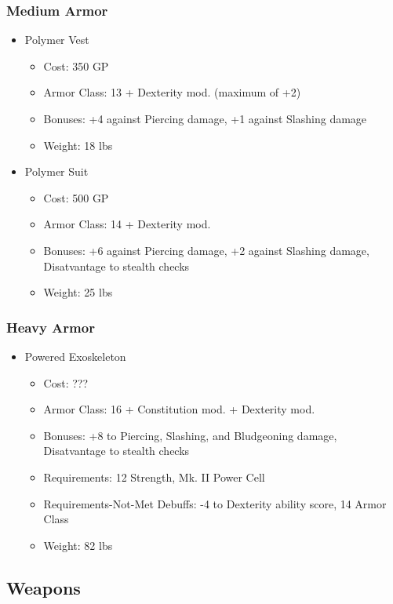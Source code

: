 \documentclass[12pt, landscape]{article}
\begin{document}
\begin{FlushLeft}
\begin{multicols}{2}
			\subsubsection{Medium Armor}
			\begin{itemize}
				\item Polymer Vest
				\begin{itemize}
					\item Cost: 350 GP
					\item Armor Class: 13 + Dexterity mod. (maximum of +2)
					\item Bonuses: +4 against Piercing damage, +1 against Slashing damage
					\item Weight: 18 lbs
				\end{itemize}
				\item Polymer Suit
				\begin{itemize}
					\item Cost: 500 GP
					\item Armor Class: 14 + Dexterity mod.
					\item Bonuses: +6 against Piercing damage, +2 against Slashing damage, Disatvantage to stealth checks
					\item Weight: 25 lbs
				\end{itemize}
			\end{itemize}
			\vfill

			\subsubsection{Heavy Armor}
			\begin{itemize}
				\item Powered Exoskeleton
				\begin{itemize}
					\item Cost: ???
					\item Armor Class: 16 + Constitution mod. + Dexterity mod.
					\item Bonuses: +8 to Piercing, Slashing, and Bludgeoning damage, Disatvantage to stealth checks
					\item Requirements: 12 Strength, Mk. II Power Cell
					\item Requirements-Not-Met Debuffs: -4 to Dexterity ability score, 14 Armor Class
					\item Weight: 82 lbs
				\end{itemize}
			\end{itemize}
			\vfill \pagebreak

			\subsection{Weapons}


\end{multicols}
\end{FlushLeft}
\end{document}
